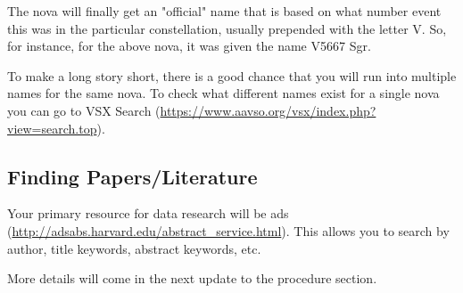\documentclass{article}
\begin{document}
The nova will finally get an "official" name that is based on what number event this was in the particular constellation, usually prepended with the letter V. So, for instance, for the above nova, it was given the name V5667 Sgr. 

To make a long story short, there is a good chance that you will run into multiple names for the same nova. To check what different names exist for a single nova you can go to VSX Search (\url{https://www.aavso.org/vsx/index.php?view=search.top}).





\subsection{Finding Papers/Literature}
Your primary resource for data research will be ads (\url{http://adsabs.harvard.edu/abstract_service.html}). This allows you to search by author, title keywords, abstract keywords, etc.

More details will come in the next update to the procedure section. 









\newpage
\appendix
\end{document}
